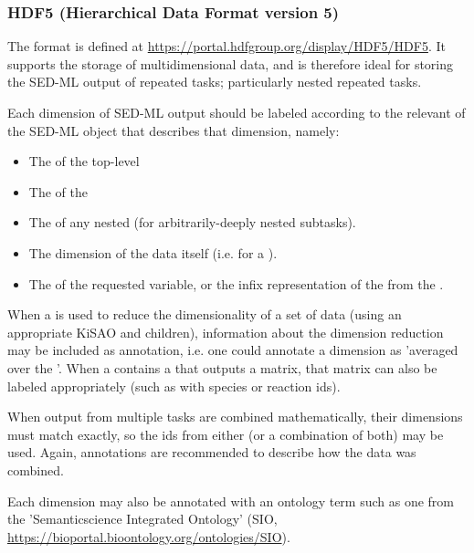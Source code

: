 \begin{blockChanged}
\subsubsection{HDF5 (Hierarchical Data Format version 5)}
\label{sec:dataFormatHDF5}
The format  is defined at \url{https://portal.hdfgroup.org/display/HDF5/HDF5}.  It supports the storage of multidimensional data, and is therefore ideal for storing the SED-ML output of repeated tasks; particularly nested repeated tasks.

Each dimension of SED-ML \RepeatedTask output should be labeled according to the relevant  of the SED-ML object that describes that dimension, namely:

\begin{itemize}
    \item The  of the top-level \RepeatedTask
    \item The  of the \SubTask
    \item The  of any nested \SubTask (for arbitrarily-deeply nested subtasks).
    \item The dimension of the data itself (i.e.  for a \UniformTimeCourse).
    \item The  of the requested variable, or the infix representation of the \Math from the \DataGenerator.
\end{itemize}

When a \DependentVariable is used to reduce the dimensionality of a set of data (using an appropriate KiSAO  and \AppliedDimension children), information about the dimension reduction may be included as annotation, i.e. one could annotate a \SubTask dimension as 'averaged over the \RepeatedTask \element{[id]}'.  When a \DataGenerator contains a \DependentVariable that outputs a matrix, that matrix can also be labeled appropriately (such as with species or reaction ids).

When output from multiple tasks are combined mathematically, their dimensions must match exactly, so the ids from either (or a combination of both) may be used.  Again, annotations are recommended to describe how the data was combined.

Each dimension may also be annotated with an ontology term such as one from the 'Semanticscience Integrated Ontology' (SIO, \url{https://bioportal.bioontology.org/ontologies/SIO}).

\end{blockChanged}


